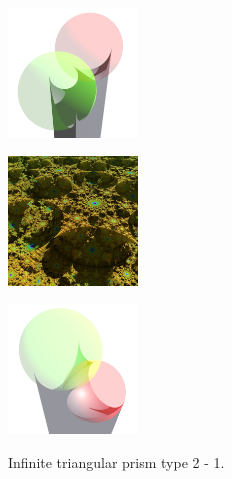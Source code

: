 \documentclass[suppldata, dvipdfmx]{interact}
\theoremstyle{plain}%
\theoremstyle{definition}
\theoremstyle{remark}
\theoremstyle{problemstyle}
\begin{document}
\begin{figure}[h!tbp]
 \begin{minipage}{0.5\textwidth}
  \begin{minipage}[t]{0.24\textwidth}
   \centering
   \includegraphics[width=1.35in, height=1.35in, keepaspectratio]{./img/sphairahedron/pentahedralPrism/sphairaInfType2_1.jpg}
   \label{fig:prismSphairaInfType2_1}
  \end{minipage}
  \hspace*{\fill}
  \begin{minipage}[t]{0.24\textwidth}
   \centering
   \includegraphics[width=1.35in, height=1.35in, keepaspectratio]{./img/sphairahedron/pentahedralPrism/limitsetInfType2_1.jpg}
   \label{fig:prismLimitInfType2_1}
  \end{minipage}
  \hspace*{\fill}
  \caption{Infinite triangular prism type 2 - 1.}
  \label{fig:prismInfType2_1}
 \end{minipage}
 \hspace*{\fill}
 \begin{minipage}{0.5\textwidth}
  \begin{minipage}[t]{0.24\textwidth}
   \centering
   \includegraphics[width=1.35in, height=1.35in, keepaspectratio]{./img/sphairahedron/pentahedralPrism/sphairaInfType2_2.jpg}
   \label{fig:prismSphairaInfType2_2}

\end{minipage}
\end{minipage}
\end{figure}
\end{document}
